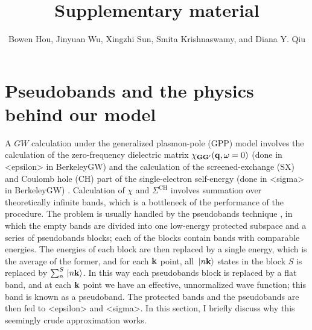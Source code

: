 \documentclass[hyperref, a4paper]{article}
\title{Supplementary material}
\author{Bowen Hou, Jinyuan Wu, Xingzhi Sun, Smita Krishnaswamy, and Diana Y. Qiu}
\def\texttt#1{<#1>}%
\newcommand{\shortcode}[1]{\texttt{#1}}
\begin{document}
\maketitle

\section{Pseudobands and the physics behind our model}

A $GW$ calculation under the generalized plasmon-pole (GPP) model
involves the calculation of the zero-frequency dielectric matrix $\chi_{\vb{G} \vb{G}'}(\vb{q}, \omega = 0)$
(done in \shortcode{epsilon} in BerkeleyGW)
and the calculation of the screened-exchange (SX) and Coulomb hole (CH) part 
of the single-electron self-energy 
(done in \shortcode{sigma} in BerkeleyGW) \cite{deslippe2012berkeleygw}.
Calculation of $\chi$ and $\Sigma^{\text{CH}}$ involves 
summation over theoretically infinite bands, 
which is a bottleneck of the performance of the procedure.
The problem is usually handled by the pseudobands technique \cite{del2019large},
in which the empty bands are divided into one low-energy protected subspace 
and a series of pseudobands blocks; 
each of the blocks contain bands with comparable energies.
The energies of each block are then replaced by a single energy, 
which is the average of the former, 
and for each $\vb{k}$ point, 
all $\ket*{n \vb{k}}$ states in the block $S$ is replaced by $\sum_n^S \ket*{n \vb{k}}$.
In this way each pseudobands block is replaced by a flat band, 
and at each $\vb{k}$ point we have an effective, unnormalized wave function;
this band is known as a pseudoband. 
The protected bands and the pseudobands are then fed to \shortcode{epsilon} and \shortcode{sigma}.
In this section, I briefly discuss why this seemingly crude approximation works.
\end{document}
